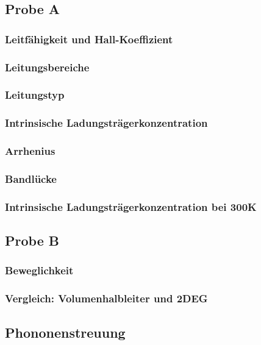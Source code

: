 \subsection{Probe A}
\subsubsection{Leitfähigkeit und Hall-Koeffizient}

\subsubsection{Leitungsbereiche}

\subsubsection{Leitungstyp}

\subsubsection{Intrinsische Ladungsträgerkonzentration}

\subsubsection{Arrhenius}

\subsubsection{Bandlücke}

\subsubsection{Intrinsische Ladungsträgerkonzentration bei 300K}

\subsection{Probe B}
\subsubsection{Beweglichkeit}

\subsubsection{Vergleich: Volumenhalbleiter und 2DEG}

\subsection{Phononenstreuung}


